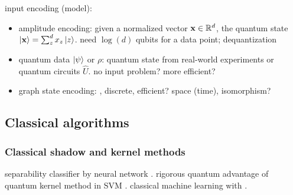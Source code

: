 \documentclass[
10pt,
aps,
pra,
linenumbers,
floatfix,
]{revtex4-2}
\theoremstyle{plain}
\theoremstyle{definition}
\newtheorem{remark}{Remark}
\newcommand{\U}{\hat{U}}
\newcommand{\dm}{\rho}
\newcommand{\oracle}{\hat{O}}
\begin{document}
	input encoding (model): 
	\begin{itemize}


		\item amplitude encoding: given a normalized vector $\vb{x}\in\mathbb{R}^d$, the quantum state $\ket{\vb{x}}=\sum_z^d x_z\ket{z}$. 
		need $\log(d) $ qubits for a data point; dequantization \cite{tangQuantumPrincipalComponent2021}

		\item quantum data $\ket{\psi}$ or $\dm$: quantum state from real-world experiments or quantum circuits $\U$.
		no input problem? more efficient?

		\item graph state encoding: , discrete, efficient? space (time), isomorphism?

	\end{itemize}

\subsection{Classical algorithms}
\subsubsection{Classical shadow and kernel methods}\label{sec:classical_machine_learning}
separability classifier by neural network \cite{luSeparabilityEntanglementClassifierMachine2018}.
rigorous quantum advantage of quantum kernel method in SVM \cite{liuRigorousRobustQuantum2021}.
classical machine learning with  \cite{huangProvablyEfficientMachine2021}.
\end{document}
